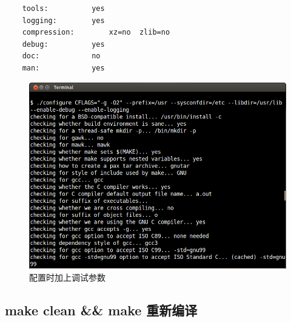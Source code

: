 {\begin{shaded}
\begin{verbatim}
    tools:          yes
    logging:        yes
    compression:        xz=no  zlib=no
    debug:          yes
    doc:            no
    man:            yes
\end{verbatim}\end{shaded}}
\begin{figure}[htbp]
\centering
\includegraphics{./pictures/2-1-configure.png}
\caption{配置时加上调试参数}
\end{figure}

\subsection{make clean \&\& make 重新编译}

